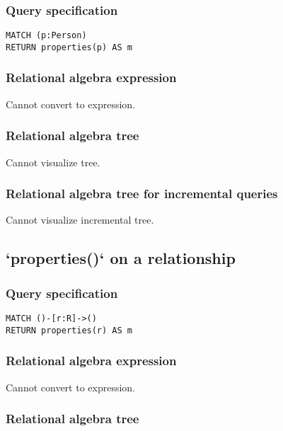 \subsubsection*{Query specification}

\begin{lstlisting}
MATCH (p:Person)
RETURN properties(p) AS m
\end{lstlisting}

\subsubsection*{Relational algebra expression}

Cannot convert to expression.

\subsubsection*{Relational algebra tree}

Cannot visualize tree.

\subsubsection*{Relational algebra tree for incremental queries}

Cannot visualize incremental tree.

\subsection{`properties()` on a relationship}

\subsubsection*{Query specification}

\begin{lstlisting}
MATCH ()-[r:R]->()
RETURN properties(r) AS m
\end{lstlisting}

\subsubsection*{Relational algebra expression}

Cannot convert to expression.

\subsubsection*{Relational algebra tree}

